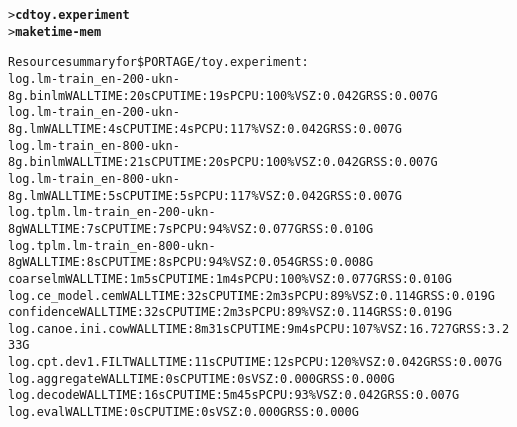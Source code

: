 \documentclass[11pt,letterpaper]{article}
\begin{document}
\begin{small}
\begin{alltt}
> \textbf{cd toy.experiment}
> \textbf{make time-mem}
\end{alltt}
\end{small}
\vspace{-2em}
\begin{tiny}
\begin{alltt}
Resource summary for \$PORTAGE/toy.experiment:
         log.lm-train_en-200-ukn-8g.binlm                 WALL TIME: 20s      CPU TIME: 19s       PCPU: 100\%   VSZ: 0.042G    RSS: 0.007G
         log.lm-train_en-200-ukn-8g.lm                    WALL TIME: 4s       CPU TIME: 4s        PCPU: 117\%   VSZ: 0.042G    RSS: 0.007G
         log.lm-train_en-800-ukn-8g.binlm                 WALL TIME: 21s      CPU TIME: 20s       PCPU: 100\%   VSZ: 0.042G    RSS: 0.007G
         log.lm-train_en-800-ukn-8g.lm                    WALL TIME: 5s       CPU TIME: 5s        PCPU: 117\%   VSZ: 0.042G    RSS: 0.007G
         log.tplm.lm-train_en-200-ukn-8g                  WALL TIME: 7s       CPU TIME: 7s        PCPU: 94\%    VSZ: 0.077G    RSS: 0.010G
         log.tplm.lm-train_en-800-ukn-8g                  WALL TIME: 8s       CPU TIME: 8s        PCPU: 94\%    VSZ: 0.054G    RSS: 0.008G
      coarselm                                            WALL TIME: 1m5s     CPU TIME: 1m4s      PCPU: 100\%   VSZ: 0.077G    RSS: 0.010G
         log.ce_model.cem                                 WALL TIME: 32s      CPU TIME: 2m3s      PCPU: 89\%    VSZ: 0.114G    RSS: 0.019G
      confidence                                          WALL TIME: 32s      CPU TIME: 2m3s      PCPU: 89\%    VSZ: 0.114G    RSS: 0.019G
         log.canoe.ini.cow                                WALL TIME: 8m31s    CPU TIME: 9m4s      PCPU: 107\%   VSZ: 16.727G   RSS: 3.233G
         log.cpt.dev1.FILT                                WALL TIME: 11s      CPU TIME: 12s       PCPU: 120\%   VSZ: 0.042G    RSS: 0.007G
            log.aggregate                                 WALL TIME: 0s       CPU TIME: 0s                     VSZ: 0.000G    RSS: 0.000G
            log.decode                                    WALL TIME: 16s      CPU TIME: 5m45s     PCPU: 93\%    VSZ: 0.042G    RSS: 0.007G
            log.eval                                      WALL TIME: 0s       CPU TIME: 0s                     VSZ: 0.000G    RSS: 0.000G

\end{alltt}
\end{tiny}
\end{document}
